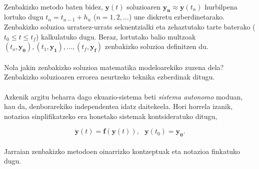 \paragraph*{}Zenbakizko metodo baten bidez, $\mathbf{y}(t)$ soluzioaren $\mathbf{y_n} \approx \mathbf{y}(t_n)$ hurbilpena lortuko dugu $t_n=t_{n-1}+h_n$  ($n=1,2,\dots$)  une diskretu ezberdinetarako. Zenbakizko soluzioa urratsez-urrats sekuentzialki eta zehaztutako tarte baterako ($t_0\le t \le t_f$) kalkulatuko dugu. Beraz, lortutako balio  multzoak $(t_o,\mathbf{y_0}),(t_1,\mathbf{y_1}),\dots,(t_f,\mathbf{y_f})$ zenbakizko soluzioa definitzen du.   

\paragraph*{} Nola jakin zenbakizko soluzioa matematika modeloarekiko zuzena dela? Zenbakizko soluzioaren errorea neurtzeko teknika ezberdinak ditugu.           

\paragraph*{} Azkenik argitu beharra dago ekuazio-sistema beti \emph{sistema autonomo} moduan, hau da, denborarekiko independentea idatz daitekeela. Hori horrela izanik, notazioa sinplifikatzeko era honetako sistemak kontsideratuko ditugu,   

\begin{equation}
\dot{\mathbf{y}}(t)=\mathbf{f}(\mathbf{y}(t)),\ \ \ \mathbf{y}(t_0)=\mathbf{y_0}.
\end{equation}


\paragraph*{}Jarraian zenbakizko metodoen oinarrizko kontzeptuak eta notazioa finkatuko dugu.

